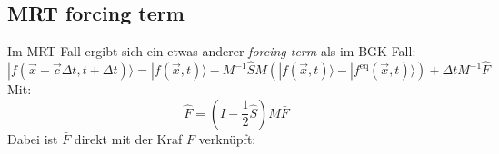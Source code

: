 \documentclass[a4paper,10pt]{scrreprt}
\begin{document}
\subsection{MRT forcing term}
Im MRT-Fall ergibt sich ein etwas anderer \emph{forcing term} als im BGK-Fall:
\begin{equation}
 | f(\vec{x} + \vec{c} \Delta t, t + \Delta t) \rangle = | f(\vec{x},t) \rangle - M^{-1} \hat{S} M \left( | f(\vec{x},t) \rangle - | f^{\text{eq}}(\vec{x},t) \rangle \right) + \Delta t M^{-1} \hat{F} 
\end{equation}
Mit:
\begin{equation}
 \hat{F} = \left( I - \frac{1}{2} \hat{S} \right) M \bar{F}
\end{equation}
Dabei ist $\bar{F}$ direkt mit der Kraf $F$ verknüpft:




\appendix
\end{document}
